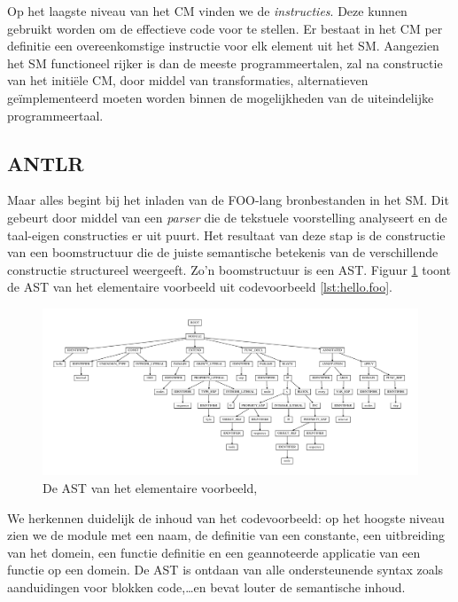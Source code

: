 Op het laagste niveau van het CM vinden we de \emph{instructies}. Deze kunnen
gebruikt worden om de effectieve code voor te stellen. Er bestaat in het CM per
definitie een overeenkomstige instructie voor elk element uit het SM. Aangezien
het SM functioneel rijker is dan de meeste programmeertalen, zal na constructie
van het initi\"ele CM, door middel van transformaties, alternatieven
ge\"implementeerd moeten worden binnen de mogelijkheden van de uiteindelijke
programmeertaal.

\subsection{ANTLR}
\label{subsection:devel-antlr}

Maar alles begint bij het inladen van de FOO-lang bronbestanden in het SM. Dit
gebeurt door middel van een \emph{parser} die de tekstuele voorstelling
analyseert en de taal-eigen constructies er uit puurt. Het resultaat van deze
stap is de constructie van een boomstructuur die de juiste semantische
betekenis van de verschillende constructie structureel weergeeft. Zo'n
boomstructuur is een AST. Figuur \ref{fig:devel-ast} toont de AST van het
elementaire voorbeeld uit codevoorbeeld \ref{lst:hello.foo}.

\begin{figure}[ht]
  \centering
  \includegraphics[width=\linewidth]{resources/hello_ast.pdf}
  \caption{De AST van het elementaire voorbeeld, }
  \label{fig:devel-ast}
\end{figure}

We herkennen duidelijk de inhoud van het codevoorbeeld: op het hoogste niveau
zien we de module met een naam, de definitie van een constante, een uitbreiding
van het domein, een functie definitie en een geannoteerde applicatie van een
functie op een domein. De AST is ontdaan van alle ondersteunende syntax zoals
aanduidingen voor blokken code,\dots en bevat louter de semantische inhoud.

